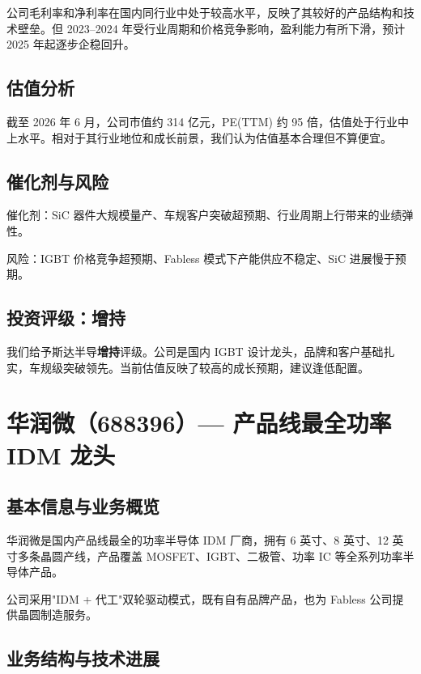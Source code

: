 公司毛利率和净利率在国内同行业中处于较高水平，反映了其较好的产品结构和技术壁垒。但 2023–2024 年受行业周期和价格竞争影响，盈利能力有所下滑，预计 2025 年起逐步企稳回升。

\subsection{估值分析}

截至 2026 年 6 月，公司市值约 314 亿元，PE(TTM) 约 95 倍，估值处于行业中上水平。相对于其行业地位和成长前景，我们认为估值基本合理但不算便宜。

\subsection{催化剂与风险}

催化剂：SiC 器件大规模量产、车规客户突破超预期、行业周期上行带来的业绩弹性。

风险：IGBT 价格竞争超预期、Fabless 模式下产能供应不稳定、SiC 进展慢于预期。

\subsection{投资评级：增持}

我们给予斯达半导\textbf{增持}评级。公司是国内 IGBT 设计龙头，品牌和客户基础扎实，车规级突破领先。当前估值反映了较高的成长预期，建议逢低配置。

\section{华润微（688396）— 产品线最全功率 IDM 龙头}

\subsection{基本信息与业务概览}

华润微是国内产品线最全的功率半导体 IDM 厂商，拥有 6 英寸、8 英寸、12 英寸多条晶圆产线，产品覆盖 MOSFET、IGBT、二极管、功率 IC 等全系列功率半导体产品。

公司采用"IDM + 代工"双轮驱动模式，既有自有品牌产品，也为 Fabless 公司提供晶圆制造服务。

\subsection{业务结构与技术进展}

